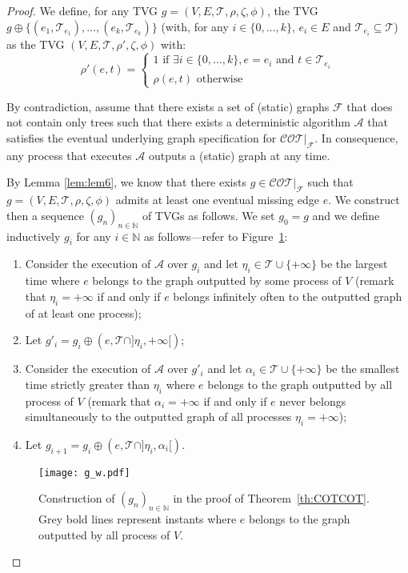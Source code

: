 \documentclass[11pt]{article}
\begin{document}
\begin{proof}
We define, for any TVG $g=(V,E,\mathcal{T},\rho,\zeta,\phi)$,  the TVG $g\oplus\{(e_1,\mathcal{T}_{e_1}),\ldots,(e_k,\mathcal{T}_{e_k})\}$ (with, for any $i\in\{0,\ldots,k\}$, $e_i\in E$ and $\mathcal{T}_{e_i}\subseteq\mathcal{T}$) as the TVG $(V,E,\mathcal{T},\rho',\zeta,\phi)$ with:
\[\rho'(e,t)=\begin{cases}
1 \text{ if } \exists i\in\{0,\ldots,k\}, e=e_i \text{ and } t\in\mathcal{T}_{e_i}\\
\rho(e,t) \text{ otherwise}
\end{cases}\]

By contradiction, assume that there exists a set of (static) graphs $\mathcal{F}$ that does not contain only trees such that there exists a deterministic algorithm $\mathcal{A}$ that satisfies the eventual underlying graph specification for $\mathcal{COT}|_\mathcal{F}$. In consequence, any process that executes $\mathcal{A}$ outputs a (static) graph at any time.

By Lemma \ref{lem:lem6}, we know that there exists $g\in\mathcal{COT}|_\mathcal{F}$ such that $g=(V,E,\mathcal{T},\rho,\zeta,\phi)$ admits at least one eventual missing edge $e$. We construct then a sequence $(g_n)_{n\in\mathbb{N}}$ of TVGs as follows. We set $g_0=g$ and we define inductively $g_i$ for any $i\in\mathbb{N}$ as follows---refer to Figure~\ref{fig:g_w}:

\begin{enumerate}
\item Consider the execution of $\mathcal{A}$ over $g_i$ and let $\eta_{i}\in\mathcal{T}\cup\{+\infty\}$ be the largest time where $e$ belongs to the graph outputted by some process of $V$ (remark that $\eta_i=+\infty$ if and only if $e$ belongs infinitely often to the outputted graph of at least one process);
\item Let $g'_i=g_i\oplus(e,\mathcal{T}\cap]\eta_i,+\infty[)$;
\item Consider the execution of $\mathcal{A}$ over $g'_i$ and let $\alpha_{i}\in\mathcal{T}\cup\{+\infty\}$ be the smallest time strictly greater than $\eta_i$ where $e$ belongs to the graph outputted by all process of $V$ (remark that $\alpha_i=+\infty$ if and only if $e$ never belongs simultaneously to the outputted graph of all processes $\eta_i=+\infty$);
\item Let $g_{i+1}=g_i\oplus(e,\mathcal{T}\cap]\eta_i,\alpha_i[)$.
\end{enumerate}

\begin{figure}
  \centering 
  \texttt{[image: g\_w.pdf]}
  \caption{Construction of $(g_n)_{n\in\mathbb{N}}$ in the proof of Theorem~\ref{th:COTCOT}. Grey bold lines represent instants where $e$ belongs to the graph outputted by all process of $V$. \label{fig:g_w}}
\end{figure}


\end{proof}
\end{document}
